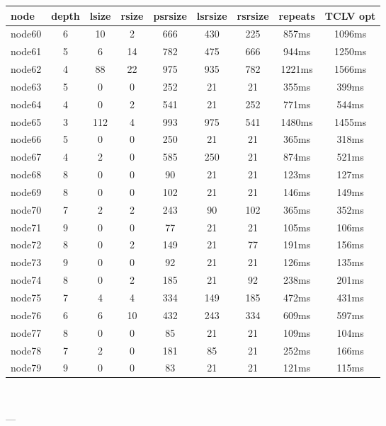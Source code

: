 \begin{tabular}{|l|c|c|c|c|c|c|c|c|}
\hline node & depth & lsize & rsize & psrsize & lsrsize & rsrsize   & repeats & TCLV opt\\
    \hline node60 & 6 & 10 & 2 & 666 & 430 & 225 & 857ms & 1096ms\\
    \hline node61 & 5 & 6 & 14 & 782 & 475 & 666 & 944ms & 1250ms\\
    \hline node62 & 4 & 88 & 22 & 975 & 935 & 782 & 1221ms & 1566ms\\
    \hline node63 & 5 & 0 & 0 & 252 & 21 & 21 & 355ms & 399ms\\
    \hline node64 & 4 & 0 & 2 & 541 & 21 & 252 & 771ms & 544ms\\
    \hline node65 & 3 & 112 & 4 & 993 & 975 & 541 & 1480ms & 1455ms\\
    \hline node66 & 5 & 0 & 0 & 250 & 21 & 21 & 365ms & 318ms\\
    \hline node67 & 4 & 2 & 0 & 585 & 250 & 21 & 874ms & 521ms\\
    \hline node68 & 8 & 0 & 0 & 90 & 21 & 21 & 123ms & 127ms\\
    \hline node69 & 8 & 0 & 0 & 102 & 21 & 21 & 146ms & 149ms\\
    \hline node70 & 7 & 2 & 2 & 243 & 90 & 102 & 365ms & 352ms\\
    \hline node71 & 9 & 0 & 0 & 77 & 21 & 21 & 105ms & 106ms\\
    \hline node72 & 8 & 0 & 2 & 149 & 21 & 77 & 191ms & 156ms\\
    \hline node73 & 9 & 0 & 0 & 92 & 21 & 21 & 126ms & 135ms\\
    \hline node74 & 8 & 0 & 2 & 185 & 21 & 92 & 238ms & 201ms\\
    \hline node75 & 7 & 4 & 4 & 334 & 149 & 185 & 472ms & 431ms\\
    \hline node76 & 6 & 6 & 10 & 432 & 243 & 334 & 609ms & 597ms\\
    \hline node77 & 8 & 0 & 0 & 85 & 21 & 21 & 109ms & 104ms\\
    \hline node78 & 7 & 2 & 0 & 181 & 85 & 21 & 252ms & 166ms\\
    \hline node79 & 9 & 0 & 0 & 83 & 21 & 21 & 121ms & 115ms\\

\hline
\end{tabular} \

---


